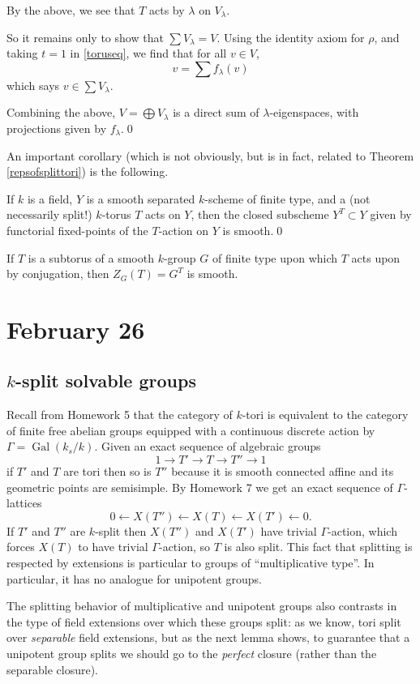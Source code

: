 \documentclass[10pt]{article}
\renewcommand{\(}{\left(}
\renewcommand{\)}{\right)}
\numberwithin{thm}{subsection}
\begin{document}
By the above, we see that $T$ acts by $\lambda$ on $V_\lambda$.

So it remains only to show that $\sum V_\lambda= V$.
Using the identity axiom for $\rho$,
and taking $t=1$ in \eqref{toruseq},
we find that for all $v\in V$,
\[v=\sum f_\lambda(v)\]
which says $v\in\sum V_\lambda$.

Combining the above, $V=\bigoplus V_\lambda$
is a direct sum of $\lambda$-eigenspaces,
with projections given by $f_\lambda$.\qed

An important corollary (which is not obviously, but is in fact, related to 
Theorem \ref{repsofsplittori}) is the following.
\begin{cor}[Homework 8]
If $k$ is a field, $Y$ is a smooth separated $k$-scheme of finite type,
and a (not necessarily split!) $k$-torus $T$
acts on $Y$,
then the closed subscheme $Y^T \subset Y$ given by functorial fixed-points of
the $T$-action on $Y$ is smooth.\qed
\end{cor}
\begin{ex}
If $T$ is a subtorus of a smooth $k$-group $G$ of
finite type upon which $T$ acts upon by conjugation, then $Z_G(T) = G^T$ is smooth.
\end{ex}
\section{February 26}
\subsection{$k$-split solvable groups}
Recall from Homework 5 that the category of $k$-tori is equivalent
to the category of finite free abelian groups equipped with a continuous
discrete action by $\Gamma=\operatorname{Gal}(k_s/k)$.
Given an exact sequence of algebraic groups
\[1\rightarrow T'\rightarrow T \rightarrow T''\rightarrow 1\]
if $T'$ and $T$ are tori then so is $T''$ because it is smooth
connected affine and its geometric points are semisimple.
By Homework 7 we get an exact sequence of $\Gamma$-lattices
\[0\leftarrow X(T'')\leftarrow X(T)\leftarrow X(T')\leftarrow 0.\]
If $T'$ and $T''$ are $k$-split then $X(T'')$ and $X(T')$ have trivial $\Gamma$-action, which forces $X(T)$ to have trivial $\Gamma$-action, so $T$ is also split.
This fact that splitting is respected by extensions is particular to groups of 
``multiplicative type''. In particular, it has no analogue for unipotent groups.

The splitting behavior of multiplicative and unipotent groups
also contrasts in the type of field extensions over which these groups split:
as we know, tori split over \textit{separable} field extensions,
but as the next lemma shows, to guarantee that a unipotent
group splits we should go to the \textit{perfect} closure (rather than the separable closure).
\end{document}
